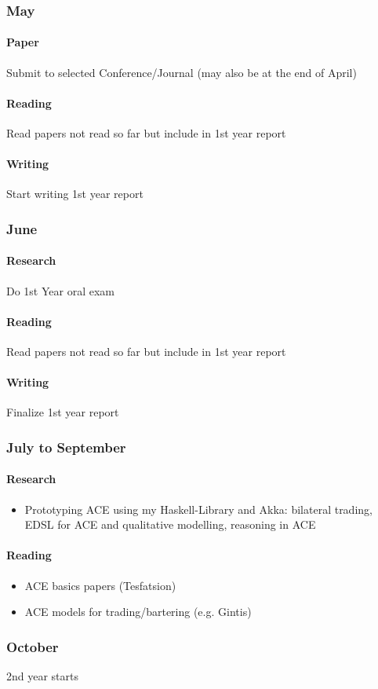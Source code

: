 \subsubsection{May}
\paragraph{Paper} Submit to selected Conference/Journal (may also be at the end of April)

\paragraph{Reading} Read papers  not read so far but include in 1st year report
	
\paragraph{Writing} Start writing 1st year report

\subsubsection{June}
\paragraph{Research} Do 1st Year oral exam

\paragraph{Reading} Read papers  not read so far but include in 1st year report

\paragraph{Writing} Finalize 1st year report

\subsubsection{July to September}
\paragraph{Research}
	\begin{itemize}
		\item Prototyping ACE using my Haskell-Library and Akka: bilateral trading, EDSL for ACE and qualitative modelling, reasoning in ACE
	\end{itemize}
	
\paragraph{Reading}
	\begin{itemize}	
		\item ACE basics papers (Tesfatsion)
		\item ACE models for trading/bartering (e.g. Gintis)
	\end{itemize}
	 
\subsubsection{October}
2nd year starts